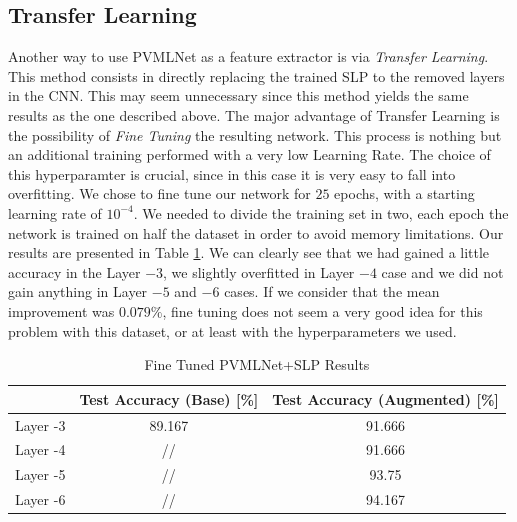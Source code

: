 \documentclass[10pt,a4paper]{report}
\begin{document}
\subsection{Transfer Learning}
Another way to use PVMLNet as a feature extractor is via \textit{Transfer Learning}. This method consists in directly replacing the trained SLP to the removed layers in the CNN. This may seem unnecessary since this method yields the same results as the one described above. The major advantage of Transfer Learning is the possibility of \textit{Fine Tuning} the resulting network. This process is nothing but an additional training performed with a very low Learning Rate. The choice of this hyperparamter is crucial, since in this case it is very easy to fall into overfitting. We chose to fine tune our network for $25$ epochs, with a starting learning rate of $10^{-4}$. We needed to divide the training set in two, each epoch the network is trained on half the dataset in order to avoid memory limitations. Our results are presented in Table \ref{tab:ftft-pvmlnet}. We can clearly see that we had gained a little accuracy in the Layer $-3$, we slightly overfitted in Layer $-4$ case and we did not gain anything in Layer $-5$ and $-6$ cases. If we consider that the mean improvement was $0.079 \%$, fine tuning does not seem a very good idea for this problem with this dataset, or at least with the hyperparameters we used. 
\begin{table}[!ht]
\centering
\begin{tabular}{|c|c|c|}
\hline
         & Test Accuracy (Base) {[}\%{]} & Test Accuracy (Augmented) {[}\%{]} \\ \hline
Layer -3 & 89.167                        & 91.666                             \\ \hline
Layer -4 & //                            & 91.666                             \\ \hline
Layer -5 & //                            & 93.75                              \\ \hline
Layer -6 & //                            & 94.167                             \\ \hline
\end{tabular}
\caption{Fine Tuned PVMLNet+SLP Results}
\label{tab:ftft-pvmlnet}
\end{table}
\end{document}
